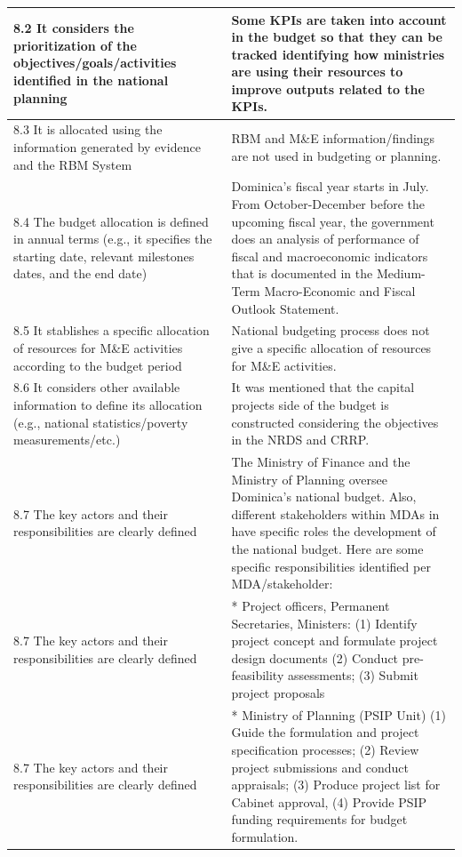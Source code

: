 \documentclass[
  10pt,
]{book}
\begin{document}
\begin{table}
\begin{tabular}[t]{l|l}
\hline
8.2 It considers the prioritization of the objectives/goals/activities identified in the national planning & Some KPIs are taken into account in the budget so that they can be tracked identifying how ministries are using their resources to improve outputs related to the KPIs.\\
\hline
8.3 It is allocated using the information generated by evidence and the RBM System & RBM and M\&E information/findings are not used in budgeting or planning.\\
\hline
8.4 The budget allocation is defined in annual terms (e.g., it specifies the starting date, relevant milestones dates, and the end date) & Dominica’s fiscal year starts in July. From October-December before the upcoming fiscal year, the government does an analysis of performance of fiscal and macroeconomic indicators that is documented in the Medium-Term Macro-Economic and Fiscal Outlook Statement.\\
\hline
8.5 It stablishes a specific allocation of resources for M\&E activities according to the budget period & National budgeting process does not give a specific allocation of resources for M\&E activities.\\
\hline
8.6 It considers other available information to define its allocation (e.g., national statistics/poverty measurements/etc.) & It was mentioned that the capital projects side of the budget is constructed considering the objectives in the NRDS and CRRP.\\
\hline
8.7 The key actors and their responsibilities are clearly defined & The Ministry of Finance and the Ministry of Planning oversee Dominica’s national budget. Also, different stakeholders within MDAs in have specific roles the development of the national budget. Here are some specific responsibilities identified per MDA/stakeholder:\\
\hline
8.7 The key actors and their responsibilities are clearly defined & * Project officers, Permanent Secretaries, Ministers: (1) Identify project concept and formulate project design documents (2) Conduct pre-feasibility assessments; (3) Submit project proposals\\
\hline
8.7 The key actors and their responsibilities are clearly defined & * Ministry of Planning (PSIP Unit) (1) Guide the formulation and project specification processes; (2) Review project submissions and conduct appraisals; (3) Produce project list for Cabinet approval, (4) Provide PSIP funding requirements for budget formulation.\\

\end{tabular}
\end{table}
\end{document}
